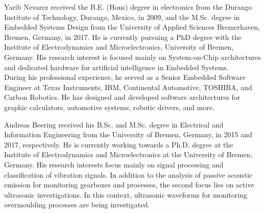 \begin{IEEEbiography}{Yarib Nevarez} received the B.E. (Hons) degree in electronics from the Durango Institute of Technology, Durango, Mexico, in 2009, and the M.Sc. degree in Embedded Systems Design from the University of Applied Sciences Bremerhaven, Bremen, Germany, in 2017. He is currently pursuing a PhD degree with the Institute of Electrodynamics and Microelectronics, University of Bremen, Germany. His research interest is focused mainly on System-on-Chip architectures and dedicated hardware for artificial intelligence in Embedded Systems.
\\
During his professional experience, he served as a Senior Embedded Software Engineer at Texas Instruments, IBM, Continental Automotive, TOSHIBA, and Carbon Robotics. He has designed and developed software architectures for graphic calculators, automotive systems, robotic drivers, and more.
	
\end{IEEEbiography}

\begin{IEEEbiography}{Andreas Beering} received his B.Sc. and M.Sc. degree in Electrical and Information Engineering  from the University of Bremen, Germany, in 2015 and 2017, respectively. He is currently working towards a Ph.D. degree at the Institute of Electrodynamics and Microelectronics at the University of Bremen, Germany. His research interests focus mainly on signal processing and classification of vibration signals. In addition to the analysis of passive acoustic emission for monitoring gearboxes and processes, the second focus lies on active ultrasonic investigations.
In this context, ultrasonic waveforms for monitoring overmoulding processes are being investigated.
\end{IEEEbiography}

